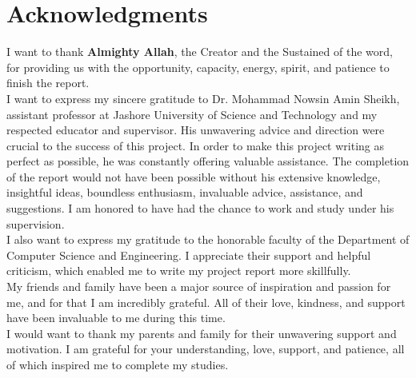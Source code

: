 \chapter*{Acknowledgments}
I want to thank \textbf{Almighty Allah}, the Creator and the Sustained of the word, for providing us with the opportunity, capacity, energy, spirit, and patience to finish the report.
\\
I want to express my sincere gratitude to Dr. Mohammad Nowsin Amin Sheikh, assistant professor at Jashore University of Science and Technology and my respected educator and supervisor. His unwavering advice and direction were crucial to the success of this project. In order to make this project writing as perfect as possible, he was constantly offering valuable assistance. The completion of the report would not have been possible without his extensive knowledge, insightful ideas, boundless enthusiasm, invaluable advice, assistance, and suggestions. I am honored to have had the chance to work and study under his supervision.
\\
I also want to express my gratitude to the honorable faculty of the Department of Computer Science and Engineering. I appreciate their support and helpful criticism, which enabled me to write my project report more skillfully.
\\
My friends and family have been a major source of inspiration and passion for me, and for that I am incredibly grateful. All of their love, kindness, and support have been invaluable to me during this time.
\\
I would want to thank my parents and family for their unwavering support and motivation. I am grateful for your understanding, love, support, and patience, all of which inspired me to complete my studies.

\listofabbreviations

\tableofcontents

\newpage
\listoffigures
\newpage
\listoftables
\newpage
